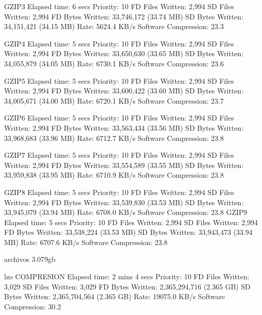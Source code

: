 GZIP3
  Elapsed time:           6 secs
  Priority:               10
  FD Files Written:       2,994
  SD Files Written:       2,994
  FD Bytes Written:       33,746,172 (33.74 MB)
  SD Bytes Written:       34,151,421 (34.15 MB)
  Rate:                   5624.4 KB/s
  Software Compression:   23.3%
  
GZIP4
  Elapsed time:           5 secs
  Priority:               10
  FD Files Written:       2,994
  SD Files Written:       2,994
  FD Bytes Written:       33,650,630 (33.65 MB)
  SD Bytes Written:       34,055,879 (34.05 MB)
  Rate:                   6730.1 KB/s
  Software Compression:   23.6%

GZIP5
  Elapsed time:           5 secs
  Priority:               10
  FD Files Written:       2,994
  SD Files Written:       2,994
  FD Bytes Written:       33,600,422 (33.60 MB)
  SD Bytes Written:       34,005,671 (34.00 MB)
  Rate:                   6720.1 KB/s
  Software Compression:   23.7%
  
GZIP6
  Elapsed time:           5 secs
  Priority:               10
  FD Files Written:       2,994
  SD Files Written:       2,994
  FD Bytes Written:       33,563,434 (33.56 MB)
  SD Bytes Written:       33,968,683 (33.96 MB)
  Rate:                   6712.7 KB/s
  Software Compression:   23.8%

GZIP7
  Elapsed time:           5 secs
  Priority:               10
  FD Files Written:       2,994
  SD Files Written:       2,994
  FD Bytes Written:       33,554,589 (33.55 MB)
  SD Bytes Written:       33,959,838 (33.95 MB)
  Rate:                   6710.9 KB/s
  Software Compression:   23.8%

GZIP8
  Elapsed time:           5 secs
  Priority:               10
  FD Files Written:       2,994
  SD Files Written:       2,994
  FD Bytes Written:       33,539,830 (33.53 MB)
  SD Bytes Written:       33,945,079 (33.94 MB)
  Rate:                   6708.0 KB/s
  Software Compression:   23.8%
GZIP9
  Elapsed time:           5 secs
  Priority:               10
  FD Files Written:       2,994
  SD Files Written:       2,994
  FD Bytes Written:       33,538,224 (33.53 MB)
  SD Bytes Written:       33,943,473 (33.94 MB)
  Rate:                   6707.6 KB/s
  Software Compression:   23.8%



  
archivos 3.079gb

lzo COMPRESION
  Elapsed time:           2 mins 4 secs
  Priority:               10
  FD Files Written:       3,029
  SD Files Written:       3,029
  FD Bytes Written:       2,365,294,716 (2.365 GB)
  SD Bytes Written:       2,365,704,564 (2.365 GB)
  Rate:                   19075.0 KB/s
  Software Compression:   30.2%

